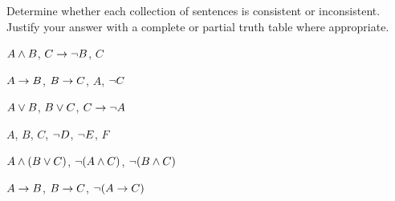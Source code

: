 \noindent\problempart
\label{pr.TT.consistent}
Determine whether each collection of sentences is consistent or inconsistent. Justify your answer with a complete or partial truth table where appropriate.
\begin{earg}
\item $A \wedge B$, $C\rightarrow \neg B$, $C$ \vspace{.5ex}%
\item $A\rightarrow B$, $B\rightarrow C$, $A$, $\neg C$\vspace{.5ex} %
\item $A \vee B$, $B\vee C$, $C\rightarrow \neg A$\vspace{.5ex} %
\item $A$, $B$, $C$, $\neg D$, $\neg E$, $F$\vspace{.5ex} %
\item $A \wedge (B \vee C)$, $\neg(A \wedge C)$, $\neg(B \wedge C)$ \vspace{.5ex}%
\item $A \rightarrow B$, $B \rightarrow C$, $\neg(A \rightarrow C)$ \vspace{.5ex} %


\end{earg}


